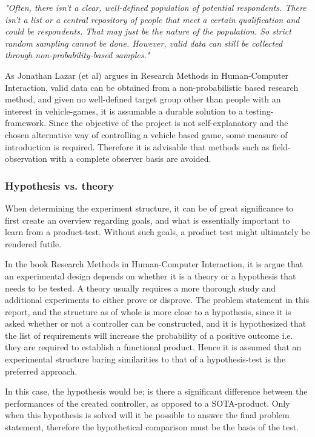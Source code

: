 \textit{"Often, there isn’t a clear, well-defined population of potential respondents. There isn’t a list or a central repository of people that meet a certain qualification and could be respondents. That may just be the nature of the population. So strict random sampling cannot be done. However, valid data can still be collected through non-probability-based samples."} \parencite{Lazar2010}
\bigskip

As Jonathan Lazar (et al) argues in Research Methods in Human-Computer Interaction, valid data can be obtained from a non-probabilistic based research method, and given no well-defined target group other than people with an interest in vehicle-games, it is assumable a durable solution to a testing-framework.
Since the objective of the project is not self-explanatory and the chosen alternative way of controlling a vehicle based game, some measure of introduction is required. Therefore it is advisable that methods such as field-observation with a complete observer basis are avoided. 	


\subsubsection{Hypothesis vs. theory}
When determining the experiment structure, it can be of great significance to first create an overview regarding goals, and what is essentially important to learn from a product-test. Without such goals, a product test might ultimately be rendered futile.
\bigskip

In the book Research Methods in Human-Computer Interaction, it is argue that an experimental design depends on whether it is a theory or a hypothesis that needs to be tested. A theory usually requires a more thorough study and additional experiments to either prove or disprove. The problem statement in this report, and the structure as of whole is more close to a hypothesis, since it is asked whether or not a controller can be constructed, and it is hypothesized that the list of requirements  will increase the probability of a positive outcome i.e. they are required to establish a functional product. Hence it is assumed that an experimental structure baring similarities to that of a hypothesis-test is the preferred approach.

In this case, the hypothesis would be; is there a significant difference between the performances of the created controller, as opposed to a SOTA-product. Only when this hypothesis is solved will it be possible to answer the final problem statement, therefore the hypothetical comparison must be the basis of the test.
\bigskip

